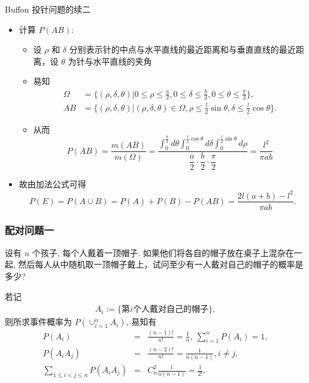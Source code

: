 \begin{frame}{{\rm Buffon} 投针问题的续二}
	\begin{itemize}
		\item 计算 $P (AB)$:\pause
		      \begin{itemize}[<+-|alert@+>]
			      \item 设 $\rho$ 和 $\delta$ 分别表示针的中点与水平直线的最近距离和与垂直直线的最近距离，设 $\theta$ 为针与水平直线的夹角
			      \item 易知
			            \begin{align*}
				            \Omega & =\{(\rho,\delta,\theta)|0\leq\rho\leq\frac{a}{2},0\leq\delta\leq\frac{b}{2},0\leq\theta\leq\frac{\pi}{2}\},            \\
				            AB     & =\{(\rho,\delta,\theta)|(\rho,\delta,\theta)\in\Omega,\rho\leq\frac{l}{2}\sin\theta,\delta\leq\frac{l}{2}\cos\theta\}.
			            \end{align*}
			      \item 从而
			            \[P(AB)=\dfrac{m(AB)}{m(\Omega)}=\dfrac{\int_{0}^{\frac{\pi}{2}}d\theta \int_{0}^{\frac{l}{2}\cos\theta}d\delta\int_{0}^{\frac{l}{2}\sin\theta}d\rho}{\dfrac{a}{2}\cdot\dfrac{b}{2}\cdot \dfrac{\pi}{2}}=\dfrac{l^2}{\pi ab}\]
		      \end{itemize}
		      \pause
		\item 故由加法公式可得
		      $$P(E)=P(A\cup B)=P(A)+P(B)-P(AB)=\frac{2l(a+b)-l^2}{\pi ab}.$$
	\end{itemize}

\end{frame}




\begin{frame}
	\frametitle{配对问题一}
	\begin{exam}
		设有 \( n \) 个孩子, 每个人戴着一顶帽子. 如果他们将各自的帽子放在桌子上混杂在一起, 然后每人从中随机取一顶帽子戴上，试问至少有一人戴对自己的帽子的概率是多少?
	\end{exam}

	\pause \jieda 若记
	\begin{eqnarray*}
		A_i:=\{\mbox{第} i\mbox{个人戴对自己的帽子}\},
	\end{eqnarray*}
	则所求事件概率为 $P (\cup_{i=1}^nA_i)$, 易知有
	\pause \begin{eqnarray*}
		P(A_i)&=&\frac{(n-1)!}{n!}=\frac{1}{n},\ \sum_{i=1}^nP(A_i)=1,\\
		P(A_iA_j)&=&\frac{(n-2)!}{n!}=\frac{1}{n(n-1)}, i\neq j,\\
		\sum_{1\leq i<j\leq n}P(A_iA_j)&=&C_n^2\frac{1}{n(n-1)}=\frac{1}{2!},\\
	\end{eqnarray*}

\end{frame}

